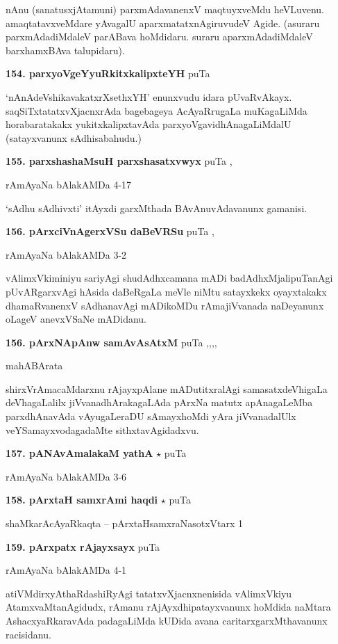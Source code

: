 nAnu (sanatusxjAtamuni) parxmAdavanenxV maqtuyxveMdu heVLuvenu. amaqtatavxveMdare yAvagalU aparxmatatxnAgiruvudeV Agide. (asuraru parxmAdadiMdaleV parABava hoMdidaru. suraru aparxmAdadiMdaleV barxhamxBAva talupidaru).

\medskip
\noindent\textbf{154. parxyoVgeYyuRkitxkalipxteYH} \hfill puTa \pageref{136a}

`nAnAdeVshikavakatxrXsethxYH' enunxvudu idara pUvaRvAkayx.
saqSiTxtatatxvXjacnxrAda bagebageya AcAyaRrugaLa muKagaLiMda horabaratakakx yukitxkalipxtavAda parxyoVgavidhAnagaLiMdalU (satayxvanunx sAdhisabahudu.)

\medskip
\noindent\textbf{155. parxshashaMsuH parxshasatxvwyx} \hfill puTa \pageref{168},\pageref{243a}

\hfill rAmAyaNa bAlakAMDa 4-17

`sAdhu sAdhivxti' itAyxdi garxMthada BAvAnuvAdavanunx gamanisi.

\medskip
\noindent\textbf{156. pArxciVnAgerxVSu daBeVRSu} \hfill puTa \pageref{204a},\pageref{231}

\hfill rAmAyaNa bAlakAMDa 3-2

vAlimxVkiminiyu sariyAgi shudAdhxcamana mADi badAdhxMjalipuTanAgi pUvARgarxvAgi hAsida daBeRgaLa meVle niMtu satayxkekx oyayxtakakx dhamaRvanenxV sAdhanavAgi mADikoMDu rAmajiVvanada naDeyanunx oLageV anevxVSaNe mADidanu.

\medskip
\noindent\textbf{156. pArxNApAnw samAvAsAtxM} \hfill puTa \pageref{151},\pageref{161},\pageref{218},\pageref{222a},\pageref{253}

\hfill mahABArata

shirxVrAmacaMdarxnu rAjayxpAlane mADutitxralAgi samasatxdeVhigaLa deVhagaLalilx jiVvanadhArakagaLAda pArxNa matutx apAnagaLeMba parxdhAnavAda vAyugaLeraDU sAmayxhoMdi yAra jiVvanadalUlx veYSamayxvodagadaMte sithxtavAgidadxvu.

\medskip
\noindent\textbf{157. pANAvAmalakaM yathA} $\star$ \hfill puTa \pageref{232}

\hfill rAmAyaNa bAlakAMDa 3-6

\medskip
\noindent\textbf{158. pArxtaH samxrAmi haqdi} $\star$ \hfill puTa \pageref{146a}

\hfill shaMkarAcAyaRkaqta -- pArxtaHsamxraNasotxVtarx 1

\medskip
\noindent\textbf{159. pArxpatx rAjayxsayx} \hfill puTa \pageref{188a}

\hfill rAmAyaNa bAlakAMDa 4-1

atiVMdirxyAthaRdashiRyAgi tatatxvXjacnxnenisida vAlimxVkiyu AtamxvaMtanAgidudx, rAmanu rAjAyxdhipatayxvanunx hoMdida naMtara AshacxyaRkaravAda padagaLiMda kUDida avana caritarxgarxMthavanunx racisidanu.

